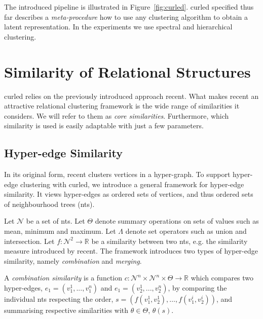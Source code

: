 The introduced pipeline is illustrated in Figure~\ref{fig:curled}.
\gls{curled} specified thus far describes a \textit{meta-procedure} how to use any clustering algorithm to obtain a latent representation.
In the experiments we use spectral and hierarchical clustering.



\section{Similarity of Relational Structures}
\label{sec:Clustering}


\gls{curled} relies on the previously introduced approach \gls{recent}.
What makes \gls{recent} an attractive relational clustering framework is the wide range of similarities it considers.
We will refer to them as \textit{core similarities}.
Furthermore, which similarity is used is easily adaptable with just a few parameters.



\subsection{Hyper-edge Similarity}

In its original form, \gls{recent} clusters vertices in a hyper-graph.
To support hyper-edge clustering with \gls{curled}, we introduce a general framework for hyper-edge similarity.
It views hyper-edges as ordered sets of vertices, and thus ordered sets of neighbourhood trees (\gls{nt}s).


Let $\mathcal{N}$ be a set of \gls{nt}s.
Let $\Theta$ denote summary operations on sets of values such as mean, minimum and maximum.
Let $\Lambda$ denote set operators such as union and intersection.
Let $f: \mathcal{N}^2 \rightarrow \mathbb{R}$ be a similarity between two \gls{nt}s, e.g. the similarity measure introduced by \gls{recent}.
The framework introduces two types of hyper-edge similarity, namely \textit{combination} and \textit{merging}.


\begin{definition}
A \textit{combination similarity} is a function $c: \mathcal{N}^n \times \mathcal{N}^n \times \Theta \rightarrow \mathbb{R}$ which compares two hyper-edges, $e_1 = (v_1^1,..., v_1^n)$ and $e_1 = (v_2^1,..., v_2^n)$, by comparing the individual \gls{nt}s respecting the order, $s = \left(f(v_1^1,v_2^1),\ldots,f(v_1^i,v_2^i) \right)$, and summarising respective similarities with $\theta \in \Theta$,  $\theta(s)$.
\end{definition}

